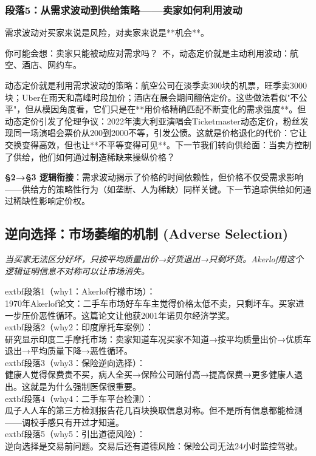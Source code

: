\documentclass[a4paper,12pt]{book}
\newenvironment{motivation}{\begin{tcolorbox}[colback=gray!10,colframe=gray!60,title=\textit{本章动机 (Motivation)},fonttitle=\bfseries,arc=0mm,leftrule=3mm]\small\itshape}{\end{tcolorbox}}
\begin{document}
	\subsubsection*{段落5：从需求波动到供给策略——卖家如何利用波动}
	需求波动对买家来说是风险，对卖家来说是**机会**。
	\begin{tcolorbox}[colback=yellow!5, title=\textit{读者行为预测}]
		你可能会想：卖家只能被动应对需求吗？\ 不，动态定价就是主动利用波动：航空、酒店、网约车。
	\end{tcolorbox}

动态定价就是利用需求波动的策略：航空公司在淡季卖300块的机票，旺季卖3000块；Uber在雨天和高峰时段加价；酒店在展会期间翻倍定价。这些做法看似"不公平"，但从模因角度看，它们只是在**用价格精确匹配不断变化的需求强度**。但动态定价引发了伦理争议：2022年澳大利亚演唱会Ticketmaster动态定价，粉丝发现同一场演唱会票价从200到2000不等，引发公愤。这就是价格退化的代价：它让交换变得高效，但也让**不平等变得可见**。下一节我们转向供给面：当卖方控制了供给，他们如何通过制造稀缺来操纵价格？

	\textbf{§2→§3 逻辑衔接}：需求波动揭示了价格的时间依赖性，但价格不仅受需求影响——供给方的策略性行为（如垄断、人为稀缺）同样关键。下一节追踪供给如何通过稀缺性影响定价权。

	
	\subsection{逆向选择：市场萎缩的机制 (Adverse Selection)}
	\begin{motivation}当买家无法区分好坏，只按平均质量出价→好货退出→只剩坏货。Akerlof用这个逻辑证明信息不对称可以让市场消失。\end{motivation}
		extbf{段落1（why1：Akerlof柠檬市场）}：\\1970年Akerlof论文：二手车市场好车车主觉得价格太低不卖，只剩坏车。买家进一步压价恶性循环。这篇论文让他获2001年诺贝尔经济学奖。\\	extbf{段落2（why2：印度摩托车案例）}：\\研究显示印度二手摩托市场：卖家知道车况买家不知道→按平均质量出价→优质车退出→平均质量下降→恶性循环。\\	extbf{段落3（why3：保险逆向选择）}：\\健康人觉得保费贵不买，病人全买→保险公司赔付高→提高保费→更多健康人退出。这就是为什么强制医保很重要。\\	extbf{段落4（why4：二手车平台检测）}：\\瓜子人人车的第三方检测报告花几百块换取信息对称。但不是所有信息都能检测——调校手感只有开过才知道。\\	extbf{段落5（why5：引出道德风险）}：\\逆向选择是交易前问题。交易后还有道德风险：保险公司无法24小时监控驾驶。
\end{document}
